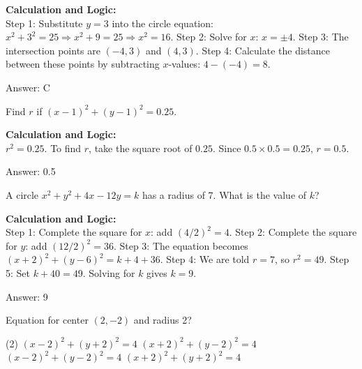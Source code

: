 \documentclass[11pt,paper=a4,answers]{exam}
\begin{document}
\begin{questions}
\begin{solution}
\textbf{Calculation and Logic:} \\
Step 1: Substitute $y = 3$ into the circle equation: $x^2 + 3^2 = 25 \Rightarrow x^2 + 9 = 25 \Rightarrow x^2 = 16$. Step 2: Solve for $x$: $x = \pm 4$. Step 3: The intersection points are $(-4, 3)$ and $(4, 3)$. Step 4: Calculate the distance between these points by subtracting $x$-values: $4 - (-4) = 8$.

\vspace{30pt}

Answer: \colorbox{yellow!100}{C}
\end{solution}

\vspace{60pt}

\question
Find $r$ if $(x-1)^2 + (y-1)^2 = 0.25$.

\begin{solution}
\textbf{Calculation and Logic:} \\
$r^2 = 0.25$. To find $r$, take the square root of $0.25$. Since $0.5 \times 0.5 = 0.25$, $r = 0.5$.

\vspace{30pt}

Answer: \colorbox{yellow!100}{0.5}
\end{solution}

\vspace{60pt}

\question
A circle $x^2 + y^2 + 4x - 12y = k$ has a radius of 7. What is the value of $k$?

\begin{solution}
\textbf{Calculation and Logic:} \\
Step 1: Complete the square for $x$: add $(4/2)^2 = 4$. Step 2: Complete the square for $y$: add $(12/2)^2 = 36$. Step 3: The equation becomes $(x+2)^2 + (y-6)^2 = k + 4 + 36$. Step 4: We are told $r = 7$, so $r^2 = 49$. Step 5: Set $k + 40 = 49$. Solving for $k$ gives $k = 9$.

\vspace{30pt}

Answer: \colorbox{yellow!100}{9}
\end{solution}

\vspace{60pt}

\question
Equation for center $(2, -2)$ and radius 2?
\begin{tasks}(2)
    \task $(x-2)^2 + (y+2)^2 = 4$
    \task $(x+2)^2 + (y-2)^2 = 4$
    \task $(x-2)^2 + (y-2)^2 = 4$
    \task $(x+2)^2 + (y+2)^2 = 4$
\end{tasks}


\end{questions}
\end{document}
